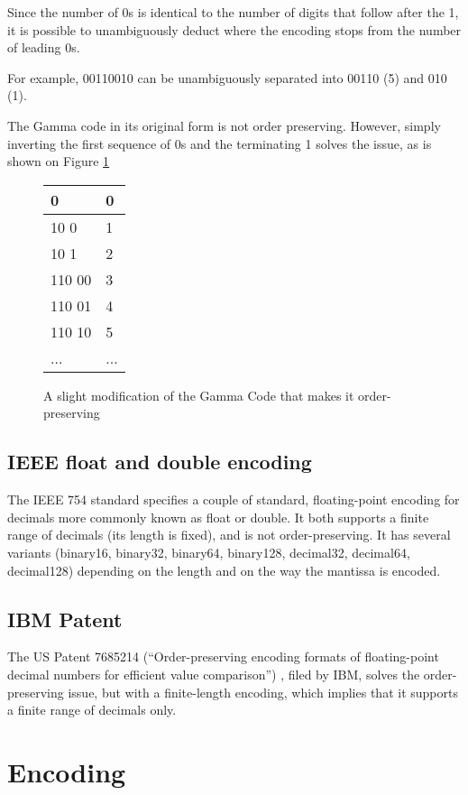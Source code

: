 \documentclass{acm_proc_article-sp}
\begin{document}
Since the number of 0s is identical to the number of digits that follow after the 1, it is possible to unambiguously deduct where the encoding stops from the number of leading 0s.

For example, 00110010 can be unambiguously separated into 00110 (5) and 010 (1).

The Gamma code in its original form is not order preserving. However, simply inverting the first sequence of 0s and the terminating 1 solves the issue, as is shown on Figure \ref{figure-gamma-encoding-tweaked}

\begin{figure}
\caption{A slight modification of the Gamma Code that makes it order-preserving}
\label{figure-gamma-encoding-tweaked}
\center
\begin{tabular}{|l|l|}
\hline
0 & 0 \\
\hline
10 0 & 1 \\
\hline
10 1 & 2 \\
\hline
110 00 & 3 \\
\hline
110 01 & 4 \\
\hline
110 10 & 5 \\
\hline
... & ... \\
\hline
\end{tabular}
\end{figure}


\subsection{IEEE float and double encoding}

The IEEE 754 standard specifies a couple of standard, floating-point encoding for decimals more commonly known as float or double. It both supports a finite range of decimals (its length is fixed), and is not order-preserving. It has several variants (binary16, binary32, binary64, binary128, decimal32, decimal64, decimal128) depending on the length and on the way the mantissa is encoded.

\subsection{IBM Patent}
The US Patent 7685214 (``Order-preserving encoding formats of floating-point decimal numbers for efficient value comparison'') , filed by IBM, solves the order-preserving issue, but with a finite-length encoding, which implies that it supports a finite range of decimals only.

\section{Encoding}
\end{document}
